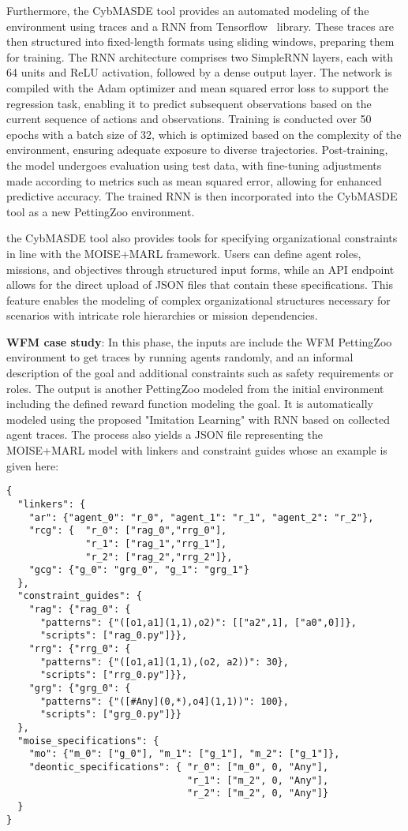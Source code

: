 \documentclass[sigconf,anonymous]{aamas}
\begin{document}
Furthermore, the CybMASDE tool provides an automated modeling of the environment using traces and a RNN from Tensorflow~\cite{tensorflow2015-whitepaper} library.
These traces are then structured into fixed-length formats using sliding windows, preparing them for training. The RNN architecture comprises two SimpleRNN layers, each with 64 units and ReLU activation, followed by a dense output layer. The network is compiled with the Adam optimizer and mean squared error loss to support the regression task, enabling it to predict subsequent observations based on the current sequence of actions and observations. Training is conducted over 50 epochs with a batch size of 32, which is optimized based on the complexity of the environment, ensuring adequate exposure to diverse trajectories. Post-training, the model undergoes evaluation using test data, with fine-tuning adjustments made according to metrics such as mean squared error, allowing for enhanced predictive accuracy. The trained RNN is then incorporated into the CybMASDE tool as a new PettingZoo environment.

the CybMASDE tool also provides tools for specifying organizational constraints in line with the MOISE+MARL framework. Users can define agent roles, missions, and objectives through structured input forms, while an API endpoint allows for the direct upload of JSON files that contain these specifications. This feature enables the modeling of complex organizational structures necessary for scenarios with intricate role hierarchies or mission dependencies.

\textbf{WFM case study}: In this phase, the inputs are include the WFM PettingZoo environment to get traces by running agents randomly, and an informal description of the goal and additional constraints such as safety requirements or roles.
The output is another PettingZoo modeled from the initial environment including the defined reward function modeling the goal. It is automatically modeled using the proposed "Imitation Learning" with RNN based on collected agent traces. The process also yields a JSON file representing the MOISE+MARL model with linkers and constraint guides whose an example is given here:

{
\footnotesize
\begin{verbatim}
{
  "linkers": {
    "ar": {"agent_0": "r_0", "agent_1": "r_1", "agent_2": "r_2"},
    "rcg": {  "r_0": ["rag_0","rrg_0"],
              "r_1": ["rag_1","rrg_1"],
              "r_2": ["rag_2","rrg_2"]},
    "gcg": {"g_0": "grg_0", "g_1": "grg_1"}
  },
  "constraint_guides": {
    "rag": {"rag_0": {
      "patterns": {"([o1,a1](1,1),o2)": [["a2",1], ["a0",0]]},
      "scripts": ["rag_0.py"]}},
    "rrg": {"rrg_0": {
      "patterns": {"([o1,a1](1,1),(o2, a2))": 30},
      "scripts": ["rrg_0.py"]}},
    "grg": {"grg_0": {
      "patterns": {"([#Any](0,*),o4](1,1))": 100},
      "scripts": ["grg_0.py"]}}
  },
  "moise_specifications": {
    "mo": {"m_0": ["g_0"], "m_1": ["g_1"], "m_2": ["g_1"]},
    "deontic_specifications": { "r_0": ["m_0", 0, "Any"],
                                "r_1": ["m_2", 0, "Any"],
                                "r_2": ["m_2", 0, "Any"]}
  }
}
\end{verbatim}
}
\end{document}
